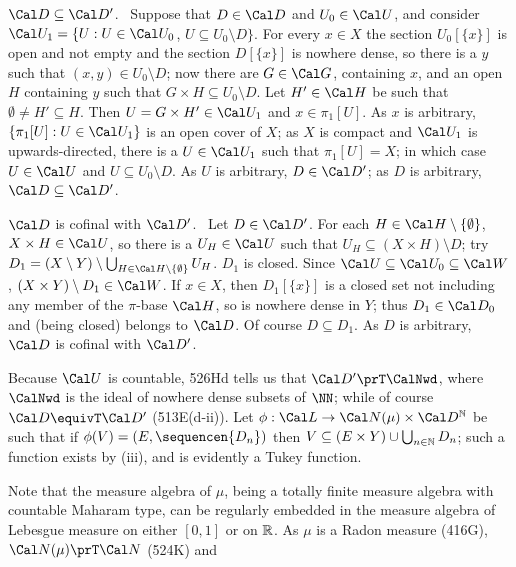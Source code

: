 {

$\Cal D\subseteq\Cal D'$.   \Prf\
Suppose that $D\in\Cal D$ and $U_0\in\Cal U$, and consider
$\Cal U_1=\{U:U\in\Cal U_0$, $U\subseteq U_0\setminus D\}$.   For every
$x\in X$ the section $U_0[\{x\}]$ is open and not empty and the section
$D[\{x\}]$ is
nowhere dense, so there is a $y$ such that $(x,y)\in U_0\setminus D$;
now there are $G\in\Cal G$, containing $x$, and
an open $H$ containing $y$ such that $G\times H\subseteq U_0\setminus D$.
Let $H'\in\Cal H$ be such that $\emptyset\ne H'\subseteq H$.
Then $U=G\times H'\in\Cal U_1$ and $x\in\pi_1[U]$.   As $x$ is arbitrary,
$\{\pi_1[U]:U\in\Cal U_1\}$ is an open cover of $X$;  as $X$ is compact and $\Cal U_1$
is upwards-directed, there is a $U\in\Cal U_1$ such that $\pi_1[U]=X$;  in which case
$U\in\Cal U$ and $U\subseteq U_0\setminus D$.   As $U$ is arbitrary, $D\in\Cal D'$;
as $D$ is arbitrary, $\Cal D\subseteq\Cal D'$.\ \Qed

$\Cal D$ is cofinal with $\Cal D'$.   \Prf\ Let $D\in\Cal D'$.
For each $H\in\Cal H\setminus\{\emptyset\}$, $X\times H\in\Cal U$, so
there is a $U_H\in\Cal U$ such that $U_H\subseteq(X\times H)\setminus D$;
try
$D_1=(X\setminus Y)\setminus\bigcup_{H\in\Cal H\setminus\{\emptyset\}}U_H$.
$D_1$ is closed.   Since $\Cal U\subseteq\Cal U_0\subseteq\Cal W$,
$(X\times Y)\setminus D_1\in\Cal W$.   If $x\in X$, then $D_1[\{x\}]$ is a
closed set not including any member of the $\pi$-base $\Cal H$, so is
nowhere dense in $Y$;  thus $D_1\in\Cal D_0$ and (being closed) belongs to
$\Cal D$.   Of course $D\subseteq D_1$.   As
$D$ is arbitrary, $\Cal D$ is cofinal with $\Cal D'$.\ \Qed

\medskip

 Because $\Cal U$ is countable, 526Hd tells us that
$\Cal D'\prT\CalNwd$, where $\CalNwd$ is the ideal of nowhere dense
subsets of $\NN$;  while of course $\Cal D\equivT\Cal D'$ (513E(d-ii)).
Let $\phi:\Cal L\to\Cal N(\mu)\times\Cal D^{\Bbb N}$ be such that if
$\phi(V)=(E,\sequencen{D_n})$ then
$V\subseteq(E\times Y)\cup\bigcup_{n\in\Bbb N}D_n$;
such a function exists by (iii), and is evidently a Tukey function.

Note that the measure algebra of $\mu$, being a totally finite measure
algebra with countable Maharam type, can be regularly embedded in the
measure algebra of Lebesgue measure on either $[0,1]$ or on $\Bbb R$.
As $\mu$ is a Radon measure (416G), $\Cal N(\mu)\prT\Cal N$ (524K) and

}
